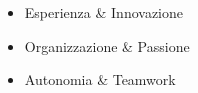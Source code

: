 \twocolumnsection
{
    \begin{skills}
    \end{skills}
}
{
    \vspace{1em}
    \begin{itemize}
        \item Esperienza \& Innovazione
        \item Organizzazione \& Passione
        \item Autonomia \& Teamwork
    \end{itemize}
}
